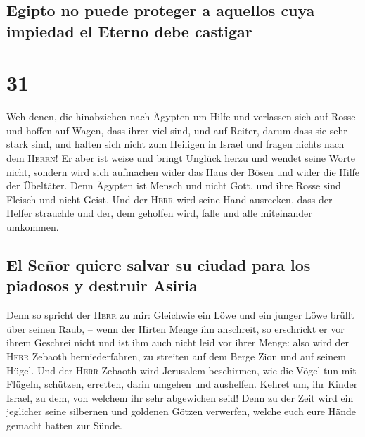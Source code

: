 \hypertarget{egipto-no-puede-proteger-a-aquellos-cuya-impiedad-el-eterno-debe-castigar}{%
\subsection{Egipto no puede proteger a aquellos cuya impiedad el Eterno
debe
castigar}\label{egipto-no-puede-proteger-a-aquellos-cuya-impiedad-el-eterno-debe-castigar}}

\hypertarget{section-30}{%
\section{31}\label{section-30}}

 Weh denen, die hinabziehen nach Ägypten um Hilfe und
verlassen sich auf Rosse und hoffen auf Wagen, dass ihrer viel sind, und
auf Reiter, darum dass sie sehr stark sind, und halten sich nicht zum
Heiligen in Israel und fragen nichts nach dem \textsc{Herrn}!
 Er aber ist weise und bringt Unglück herzu und wendet
seine Worte nicht, sondern wird sich aufmachen wider das Haus der Bösen
und wider die Hilfe der Übeltäter.  Denn Ägypten ist
Mensch und nicht Gott, und ihre Rosse sind Fleisch und nicht Geist. Und
der \textsc{Herr} wird seine Hand ausrecken, dass der Helfer strauchle
und der, dem geholfen wird, falle und alle miteinander umkommen.

\hypertarget{el-seuxf1or-quiere-salvar-su-ciudad-para-los-piadosos-y-destruir-asiria}{%
\subsection{El Señor quiere salvar su ciudad para los piadosos y
destruir
Asiria}\label{el-seuxf1or-quiere-salvar-su-ciudad-para-los-piadosos-y-destruir-asiria}}

 Denn so spricht der \textsc{Herr} zu mir: Gleichwie ein
Löwe und ein junger Löwe brüllt über seinen Raub, -- wenn der Hirten
Menge ihn anschreit, so erschrickt er vor ihrem Geschrei nicht und ist
ihm auch nicht leid vor ihrer Menge: also wird der \textsc{Herr} Zebaoth
herniederfahren, zu streiten auf dem Berge Zion und auf seinem Hügel.
 Und der \textsc{Herr} Zebaoth wird Jerusalem beschirmen,
wie die Vögel tun mit Flügeln, schützen, erretten, darin umgehen und
aushelfen.  Kehret um, ihr Kinder Israel, zu dem, von
welchem ihr sehr abgewichen seid!  Denn zu der Zeit wird
ein jeglicher seine silbernen und goldenen Götzen verwerfen, welche euch
eure Hände gemacht hatten zur Sünde.

